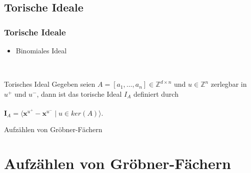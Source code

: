 \documentclass{beamer}
\begin{document}
\subsection{Torische Ideale}

\begin{frame}[<+->][fragile]
\frametitle{Torische Ideale}

\begin{itemize}
\item Binomiales Ideal
\end{itemize}
~\\
\begin{block}{Torisches Ideal}
Gegeben seien $A =\left[a_{1},\dots, a_{n}  \right] \in \mathbb{Z}^{d \times n } $ und $u \in \mathbb{Z}^{n}$ zerlegbar in $u^{+}$ und $u^{-}$, dann ist das torische Ideal $I_{A}$ definiert durch \\
~\\
\centering
$ \textbf{I}_{A} = \langle \textbf{x}^{u^{+}} - \textbf{x}^{u^{-}} \mid u \in ker \left(  A \right) \rangle . $ 

\end{block}


\end{frame}
\begin{frame}
\centerline{Aufzählen von Gröbner-Fächern}
\end{frame}


\section{Aufzählen von Gröbner-Fächern}

\end{document}
